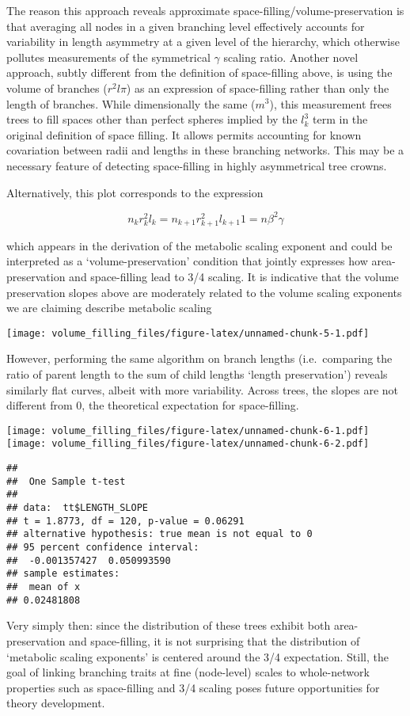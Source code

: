 \documentclass[]{article}
\begin{document}
The reason this approach reveals approximate
space-filling/volume-preservation is that averaging all nodes in a given
branching level effectively accounts for variability in length asymmetry
at a given level of the hierarchy, which otherwise pollutes measurements
of the symmetrical \(\gamma\) scaling ratio. Another novel approach,
subtly different from the definition of space-filling above, is using
the volume of branches (\(r^{2}l\pi\)) as an expression of space-filling
rather than only the length of branches. While dimensionally the same
(\(m^{3}\)), this measurement frees trees to fill spaces other than
perfect spheres implied by the \(l_{k}^{3}\) term in the original
definition of space filling. It allows permits accounting for known
covariation between radii and lengths in these branching networks. This
may be a necessary feature of detecting space-filling in highly
asymmetrical tree crowns.

Alternatively, this plot corresponds to the expression

\begin{equation}
n_{k}r_{k}^{2}l_{k} = n_{k+1}r_{k+1}^{2}l_{k+1}
1 = n\beta^{2}\gamma
\end{equation}

which appears in the derivation of the metabolic scaling exponent and
could be interpreted as a `volume-preservation' condition that jointly
expresses how area-preservation and space-filling lead to 3/4 scaling.
It is indicative that the volume preservation slopes above are
moderately related to the volume scaling exponents we are claiming
describe metabolic scaling

\texttt{[image: volume\_filling\_files/figure-latex/unnamed-chunk-5-1.pdf]}

However, performing the same algorithm on branch lengths (i.e.~comparing
the ratio of parent length to the sum of child lengths `length
preservation') reveals similarly flat curves, albeit with more
variability. Across trees, the slopes are not different from 0, the
theoretical expectation for space-filling.

\texttt{[image: volume\_filling\_files/figure-latex/unnamed-chunk-6-1.pdf]}
\texttt{[image: volume\_filling\_files/figure-latex/unnamed-chunk-6-2.pdf]}

\begin{verbatim}
## 
##  One Sample t-test
## 
## data:  tt$LENGTH_SLOPE
## t = 1.8773, df = 120, p-value = 0.06291
## alternative hypothesis: true mean is not equal to 0
## 95 percent confidence interval:
##  -0.001357427  0.050993590
## sample estimates:
##  mean of x 
## 0.02481808
\end{verbatim}

Very simply then: since the distribution of these trees exhibit both
area-preservation and space-filling, it is not surprising that the
distribution of `metabolic scaling exponents' is centered around the 3/4
expectation. Still, the goal of linking branching traits at fine
(node-level) scales to whole-network properties such as space-filling
and 3/4 scaling poses future opportunities for theory development.
\end{document}
